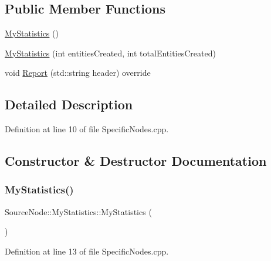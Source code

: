 \subsection*{Public Member Functions}
\begin{DoxyCompactItemize}
\item 
\hyperlink{class_source_node_1_1_my_statistics_a67a001d9265cbf1408d4ac770467ee08}{My\+Statistics} ()
\item 
\hyperlink{class_source_node_1_1_my_statistics_ae44331e668fad1f8caf1779905a3bbf2}{My\+Statistics} (int entities\+Created, int total\+Entities\+Created)
\item 
void \hyperlink{class_source_node_1_1_my_statistics_a39931b0ce449658de7d6be309dca8eee}{Report} (std\+::string header) override
\end{DoxyCompactItemize}


\subsection{Detailed Description}


Definition at line 10 of file Specific\+Nodes.\+cpp.



\subsection{Constructor \& Destructor Documentation}
\mbox{\label{class_source_node_1_1_my_statistics_a67a001d9265cbf1408d4ac770467ee08}} 
\subsubsection{\texorpdfstring{My\+Statistics()}{MyStatistics()}\hspace{0.1cm}{\footnotesize\ttfamily [1/2]}}
{\footnotesize\ttfamily Source\+Node\+::\+My\+Statistics\+::\+My\+Statistics (\begin{DoxyParamCaption}{ }\end{DoxyParamCaption})\hspace{0.3cm}{\ttfamily [inline]}}



Definition at line 13 of file Specific\+Nodes.\+cpp.

